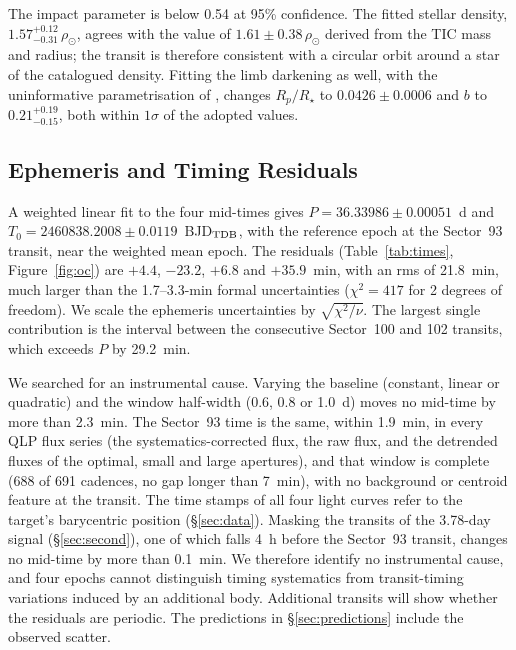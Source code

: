 \documentclass[twocolumn]{aastex631}
\begin{document}
The impact parameter is below 0.54 at 95\% confidence. The fitted stellar density, $1.57^{+0.12}_{-0.31}\,\rho_\odot$, agrees with the value of $1.61 \pm 0.38\,\rho_\odot$ derived from the TIC mass and radius; the transit is therefore consistent with a circular orbit around a star of the catalogued density. Fitting the limb darkening as well, with the uninformative parametrisation of \citet{Kipping2013}, changes $R_p/R_\star$ to $0.0426 \pm 0.0006$ and $b$ to $0.21^{+0.19}_{-0.15}$, both within $1\sigma$ of the adopted values.

\subsection{Ephemeris and Timing Residuals} \label{sec:ttv}

A weighted linear fit to the four mid-times gives $P = 36.33986 \pm 0.00051$~d and $T_0 = 2460838.2008 \pm 0.0119$~BJD$_{\rm TDB}$, with the reference epoch at the Sector~93 transit, near the weighted mean epoch. The residuals (Table~\ref{tab:times}, Figure~\ref{fig:oc}) are $+4.4$, $-23.2$, $+6.8$ and $+35.9$~min, with an rms of 21.8~min, much larger than the 1.7--3.3-min formal uncertainties ($\chi^2 = 417$ for 2 degrees of freedom). We scale the ephemeris uncertainties by $\sqrt{\chi^2/\nu}$. The largest single contribution is the interval between the consecutive Sector~100 and 102 transits, which exceeds $P$ by 29.2~min.

We searched for an instrumental cause. Varying the baseline (constant, linear or quadratic) and the window half-width (0.6, 0.8 or 1.0~d) moves no mid-time by more than 2.3~min. The Sector~93 time is the same, within 1.9~min, in every QLP flux series (the systematics-corrected flux, the raw flux, and the detrended fluxes of the optimal, small and large apertures), and that window is complete (688 of 691 cadences, no gap longer than 7~min), with no background or centroid feature at the transit. The time stamps of all four light curves refer to the target's barycentric position (\S\ref{sec:data}). Masking the transits of the 3.78-day signal (\S\ref{sec:second}), one of which falls 4~h before the Sector~93 transit, changes no mid-time by more than 0.1~min. We therefore identify no instrumental cause, and four epochs cannot distinguish timing systematics from transit-timing variations induced by an additional body. Additional transits will show whether the residuals are periodic. The predictions in \S\ref{sec:predictions} include the observed scatter.
\end{document}

